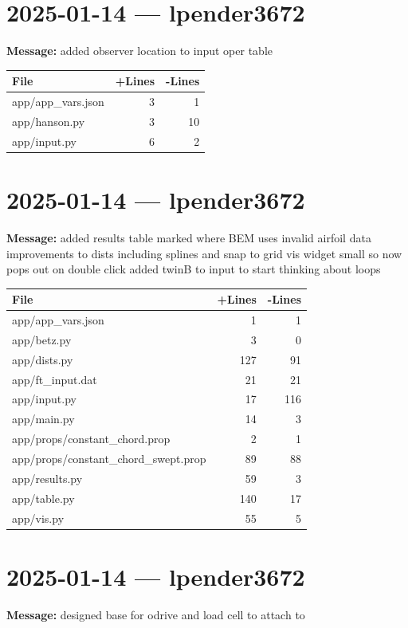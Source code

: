 \documentclass{article}
\begin{document}
\section*{2025-01-14 --- lpender3672}
\textbf{Message:} added observer location to input oper table

\begin{longtable}{|p{10cm}|r|r|}
\hline \textbf{File} & \textbf{+Lines} & \textbf{-Lines} \\
\hline
app/app\_vars.json & 3 & 1 \\
\hline
app/hanson.py & 3 & 10 \\
\hline
app/input.py & 6 & 2 \\
\hline
\end{longtable}

\section*{2025-01-14 --- lpender3672}
\textbf{Message:} added results table marked where BEM uses invalid airfoil data improvements to dists including splines and snap to grid vis widget small so now pops out on double click added twinB to input to start thinking about loops

\begin{longtable}{|p{10cm}|r|r|}
\hline \textbf{File} & \textbf{+Lines} & \textbf{-Lines} \\
\hline
app/app\_vars.json & 1 & 1 \\
\hline
app/betz.py & 3 & 0 \\
\hline
app/dists.py & 127 & 91 \\
\hline
app/ft\_input.dat & 21 & 21 \\
\hline
app/input.py & 17 & 116 \\
\hline
app/main.py & 14 & 3 \\
\hline
app/props/constant\_chord.prop & 2 & 1 \\
\hline
app/props/constant\_chord\_swept.prop & 89 & 88 \\
\hline
app/results.py & 59 & 3 \\
\hline
app/table.py & 140 & 17 \\
\hline
app/vis.py & 55 & 5 \\
\hline
\end{longtable}

\section*{2025-01-14 --- lpender3672}
\textbf{Message:} designed base for odrive and load cell to attach to
\end{document}
